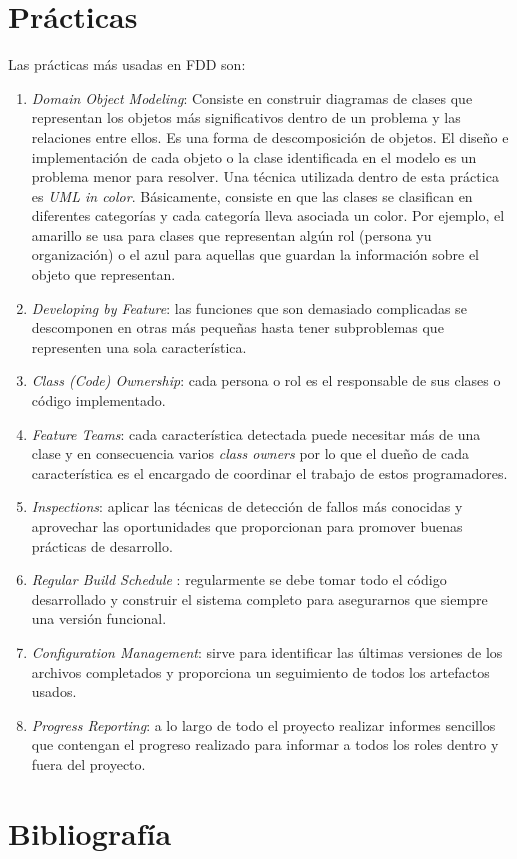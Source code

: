 \documentclass[11pt]{article}
\begin{document}
\section{Prácticas}
Las prácticas más usadas en FDD son:
\begin{enumerate}
\item \textit{Domain Object Modeling}: Consiste en construir diagramas de clases que representan los objetos más significativos dentro de un problema y las relaciones entre ellos. Es una forma de descomposición de objetos. El diseño e implementación de cada objeto o la clase identificada en el modelo es un problema menor para resolver. Una técnica utilizada dentro de esta práctica es \textit{UML in color}. Básicamente, consiste en que las clases se clasifican en diferentes categorías y cada categoría lleva asociada un color. Por ejemplo, el amarillo se usa para clases que representan algún rol (persona yu organización) o el  azul para aquellas que guardan la información sobre el objeto que representan.
\item \textit{Developing by Feature}: las funciones que son demasiado complicadas se descomponen en otras más pequeñas hasta tener subproblemas que representen una sola característica.
\item \textit{Class (Code) Ownership}: cada persona o rol es el responsable de sus clases o código implementado.
\item \textit{Feature Teams}: cada característica detectada puede necesitar más de una clase y en consecuencia varios \textit{class owners} por lo que el dueño de cada característica es el encargado de coordinar el trabajo de estos programadores.
\item  \textit{Inspections}: aplicar las técnicas de detección de fallos más conocidas y aprovechar las oportunidades que proporcionan para promover buenas prácticas de desarrollo.
\item  \textit{Regular Build Schedule }: regularmente se debe tomar todo el código desarrollado y construir el sistema completo para asegurarnos que siempre una versión funcional.
\item  \textit{Configuration Management}: sirve para identificar las últimas versiones de los archivos completados y proporciona un seguimiento de todos los artefactos usados.
\item \textit{Progress Reporting}: a lo largo de todo el proyecto realizar informes sencillos que contengan el progreso realizado para informar a todos los roles dentro y fuera del proyecto.
\end{enumerate}

\newpage
\section{Bibliografía}
\nocite{*}


\end{document}
